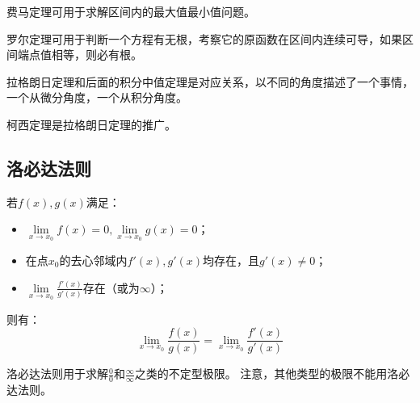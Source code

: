 费马定理可用于求解区间内的最大值最小值问题。

罗尔定理可用于判断一个方程有无根，考察它的原函数在区间内连续可导，如果区间端点值相等，则必有根。

拉格朗日定理和后面的积分中值定理是对应关系，以不同的角度描述了一个事情，一个从微分角度，一个从积分角度。

柯西定理是拉格朗日定理的推广。

\subsection{洛必达法则}

\begin{theorem}
若$f\left( x \right) ,g\left( x \right) $满足：
\begin{itemize}
    \item $\underset{x\rightarrow x_0}{\lim}f\left( x \right) =0,\underset{x\rightarrow x_0}{\lim}g\left( x \right) =0$；
    \item 在点$x_0$的去心邻域内$f'\left( x \right) ,g'\left( x \right) $均存在，且$g'\left( x \right) \ne 0$；
    \item $\underset{x\rightarrow x_0}{\lim}\frac{f'\left( x \right)}{g'\left( x \right)}$存在（或为$\infty $）；
\end{itemize}
则有：
\[
\underset{x\rightarrow x_0}{\lim}\frac{f\left( x \right)}{g\left( x \right)}=\underset{x\rightarrow x_0}{\lim}\frac{f'\left( x \right)}{g'\left( x \right)}
\]
\end{theorem}

洛必达法则用于求解$\frac{0}{0}$和$\frac{\infty}{\infty}$之类的不定型极限。
注意，其他类型的极限不能用洛必达法则。




